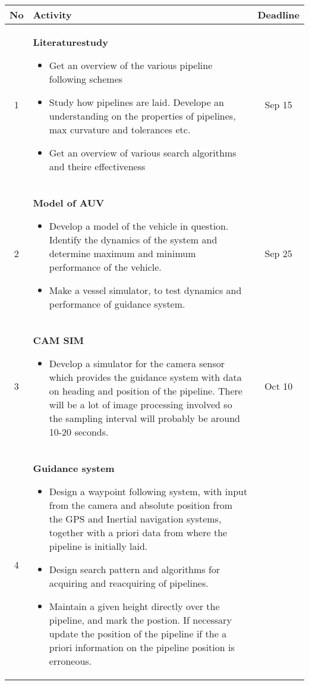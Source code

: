 \documentclass[a4paper,10pt]{article}
\begin{document}
	\begin{tabular}{| c | p{9cm} || c |}
	\hline
	No 	&	Activity	&	Deadline \\
	\hline
	\hline
	1	&	\textbf{Literaturestudy}\begin{itemize}
	 	 				 \item Get an overview of the various pipeline following schemes
	 	 				 \item Study how pipelines are laid. Develope an understanding on the properties of pipelines, max curvature and tolerances etc.
	 	 				 \item Get an overview of various search algorithms and theire effectiveness
	 	 				\end{itemize}	
								& 	Sep 15\\
	\hline
	2	&	\textbf{Model of AUV}	\begin{itemize}
	 	 	            		 \item Develop a model of the vehicle in question. Identify the dynamics of the system and determine maximum and minimum performance of the vehicle. 
						 \item Make a vessel simulator, to test dynamics and performance of guidance system.
	 	 	            		\end{itemize}
								&	Sep 25\\
	\hline
	3	&	\textbf{CAM SIM}	\begin{itemize}
	 	 	       			 \item Develop a simulator for the camera sensor which provides the guidance system with data on heading and position of the pipeline. There will be a lot of image processing involved so the sampling interval will probably be around 10-20 seconds.
	 	 	       			\end{itemize}
								&	Oct 10 \\
	\hline
	4	&	\textbf{Guidance system}\begin{itemize}
	 	 	               		 \item Design a waypoint following system, with input from the camera and absolute position from the GPS and Inertial navigation systems, together with a priori data from where the pipeline is initially laid. 
	 	 	               		 \item Design search pattern and algorithms for acquiring and reacquiring of pipelines. 
	 	 	               		 \item Maintain a given height directly over the pipeline, and mark the postion. If necessary update the position of the pipeline if the a priori information on the pipeline position is erroneous. 

\end{itemize}
\end{tabular}
\end{document}
